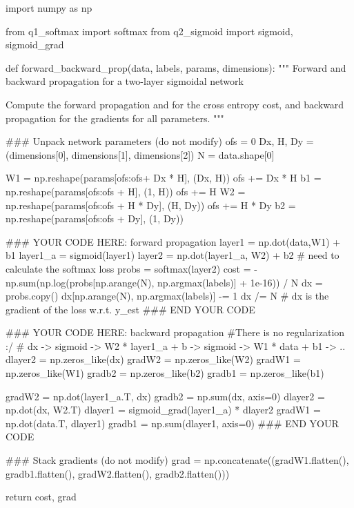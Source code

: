 \documentclass[letter,12pt]{article}
\begin{document}
\begin{python}
import numpy as np

from q1_softmax import softmax
from q2_sigmoid import sigmoid, sigmoid_grad

def forward_backward_prop(data, labels, params, dimensions):
    """
    Forward and backward propagation for a two-layer sigmoidal network
    
    Compute the forward propagation and for the cross entropy cost,
    and backward propagation for the gradients for all parameters.
    """

    ### Unpack network parameters (do not modify)
    ofs = 0
    Dx, H, Dy = (dimensions[0], dimensions[1], dimensions[2])
    N = data.shape[0]

    W1 = np.reshape(params[ofs:ofs+ Dx * H], (Dx, H))
    ofs += Dx * H
    b1 = np.reshape(params[ofs:ofs + H], (1, H))
    ofs += H
    W2 = np.reshape(params[ofs:ofs + H * Dy], (H, Dy))
    ofs += H * Dy
    b2 = np.reshape(params[ofs:ofs + Dy], (1, Dy))

    ### YOUR CODE HERE: forward propagation
    layer1   = np.dot(data,W1) + b1
    layer1_a = sigmoid(layer1)
    layer2   = np.dot(layer1_a, W2) + b2
    # need to calculate the softmax loss
    probs = softmax(layer2)
    cost  = -np.sum(np.log(probs[np.arange(N), np.argmax(labels)] +
                                         1e-16)) / N
    dx    = probs.copy()
    dx[np.arange(N), np.argmax(labels)] -= 1
    dx /= N
    # dx is the gradient of the loss w.r.t. y_{est}
    ### END YOUR CODE
    
    ### YOUR CODE HERE: backward propagation
    #There is no regularization :/
    # dx -> sigmoid -> W2 * layer1_a + b -> sigmoid -> W1 * data + b1 -> ..
    dlayer2   = np.zeros_like(dx)
    gradW2    = np.zeros_like(W2)
    gradW1    = np.zeros_like(W1)
    gradb2    = np.zeros_like(b2)
    gradb1    = np.zeros_like(b1)

    gradW2    = np.dot(layer1_a.T, dx)
    gradb2    = np.sum(dx, axis=0)
    dlayer2   = np.dot(dx, W2.T)
    dlayer1   = sigmoid_grad(layer1_a) * dlayer2
    gradW1    = np.dot(data.T, dlayer1)
    gradb1    = np.sum(dlayer1, axis=0)
    ### END YOUR CODE
    
    ### Stack gradients (do not modify)
    grad = np.concatenate((gradW1.flatten(), gradb1.flatten(), 
        gradW2.flatten(), gradb2.flatten()))
    
    return cost, grad
\end{python}
\clearpage
\end{document}

